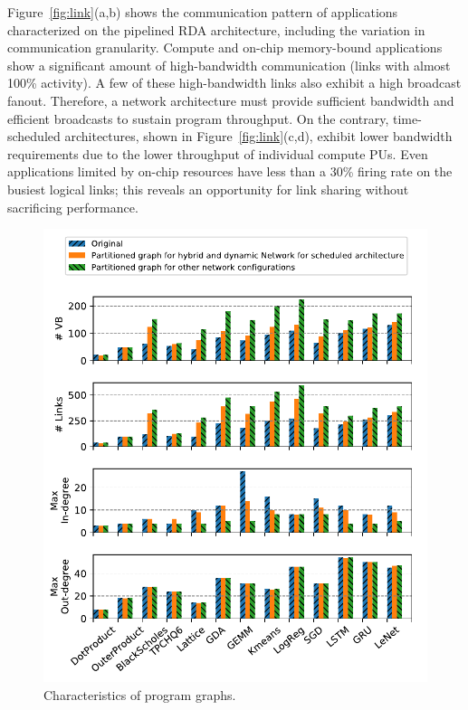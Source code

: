 Figure~\ref{fig:link}(a,b) shows the communication pattern of applications
characterized on the pipelined RDA architecture, including the variation in communication granularity. 
Compute and on-chip memory-bound applications show a significant amount of high-bandwidth communication (links with almost 100\% activity). 
A few of these high-bandwidth links also exhibit a high broadcast fanout. 
Therefore, a network architecture must provide sufficient bandwidth and efficient broadcasts to sustain program throughput.
On the contrary, time-scheduled architectures, shown in Figure~\ref{fig:link}(c,d), exhibit
lower bandwidth requirements due to the lower throughput of individual compute PUs. 
Even applications limited by on-chip resources have less than a 30\% firing rate on the busiest logical links; this reveals an opportunity for link sharing without sacrificing performance.

\begin{figure}
\centering
\includegraphics[width=0.9\columnwidth]{network/figs/graph.pdf}
\caption[Characteristics of program graphs]{Characteristics of program graphs.}\label{fig:graph}
\end{figure}

